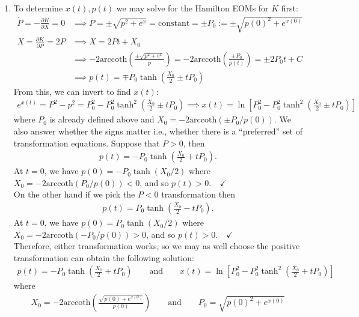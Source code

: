 \documentclass{article}
\theoremstyle{definition}
\newcommand{\p}{\partial}
\newcommand{\f}[2]{\frac{#1}{#2}}
\newcommand{\lp}{\left(}
\newcommand{\rp}{\right)}
\newcommand{\lb}{\left[}
\newcommand{\rb}{\right]}
\begin{document}
\begin{enumerate}[label=(\alph*)]
	
	
	\item To determine $x(t),p(t)$ we may solve for the Hamilton EOMs for $K$ first:
	\begin{align*}
	\dot P = -\f{\p K }{\p X} = 0 &\implies P = \pm \sqrt{p^2 +e^x}  =  \text{constant} = \pm P_0 := \pm \sqrt{p(0)^2 + e^{x(0)} }\\
	\dot X = \f{\p K}{\p P} =  2P &\implies X = 2Pt + X_0\\ 
	&\implies -2\text{arccoth}\lp \f{\pm \sqrt{p^2 +e^x}}{p} \rp = -2\text{arccoth}\lp \f{\pm P_0}{p(t)} \rp   = \pm 2P_0 t + C \\
	&\implies {p(t) = \mp  P_0\tanh\lp \f{X_0}{2} \pm  tP_0 \rp}
	\end{align*}
	From this, we can invert to find $x(t)$:
	\begin{align*}
	e^{x(t)}= P^2 - p^2 = P_0^2 - P_0^2 \tanh^2\lp \f{X_0}{2} \pm t P_0 \rp \implies { x(t) = \ln \lb P_0^2 -  P_0^2\tanh^2\lp \f{X_0}{2} \pm t P_0  \rp \rb}
	\end{align*}
	where $P_0$ is already defined above and $X_0 = -2\text{arccoth}(\pm P_0/p(0))$. We also answer whether the signs matter i.e., whether there is a ``preferred'' set of transformation equations. Suppose that $P > 0$, then 
	\begin{align*}
	p(t) = -P_0 \tanh\lp \f{X_0}{2} + tP_0 \rp.
	\end{align*}
	At $t=0$, we have $p(0) = -P_0 \tanh( X_0/2 )$ where $X_0 = -2\text{arccoth}(P_0/p(0)) < 0$, and so $p(t) > 0.\quad \checkmark$\\
	
	
	On the other hand if we pick the $P<0$ transformation then
	\begin{align*}
	p(t) = P_0 \tanh\lp \f{X_0}{2} - tP_0 \rp.
	\end{align*}
	At $t=0$, we have $p(0) = P_0 \tanh\lp X_0/2 \rp$ where $X_0 = -2\text{arccoth}(-P_0/p(0)) > 0$, and so $p(t) > 0.\quad \checkmark$\\
	
	Therefore, either transformation works, so we may as well choose the positive transformation can obtain the following solution:
	\begin{align*}
	\boxed{p(t) = -P_0\tanh\lp \f{X_0}{2} +  tP_0 \rp \quad\quad\text{and}\quad\quad x(t) = \ln \lb P_0^2 -  P_0^2\tanh^2\lp \f{X_0}{2} + t P_0  \rp \rb}
	\end{align*}
	where
	\begin{align*}
	X_0 = -2\text{arccoth}\lp \f{\sqrt{p(0)+e^{x(0)}}}{p(0)} \rp \quad\quad \text{and}\quad\quad P_0 =\sqrt{p(0)^2 + e^{x(0)}}
	\end{align*}
	

\end{enumerate}
\end{document}
